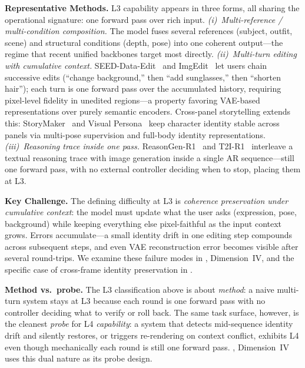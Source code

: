 \textbf{Representative Methods.} L3 capability appears in three forms, all sharing the operational signature: one forward pass over rich input. \textit{(i)~Multi-reference / multi-condition composition.} The model fuses several references (subject, outfit, scene) and structural conditions (depth, pose) into one coherent output---the regime that recent unified backbones target most directly. \textit{(ii)~Multi-turn editing with cumulative context.} SEED-Data-Edit~\citep{ge2024seed} and ImgEdit~\citep{ye2025imgedit} let users chain successive edits (``change background,'' then ``add sunglasses,'' then ``shorten hair''); each turn is one forward pass over the accumulated history, requiring pixel-level fidelity in unedited regions---a property favoring VAE-based representations over purely semantic encoders. Cross-panel storytelling extends this: StoryMaker~\citep{zhou2024storymaker} and Visual Persona~\citep{nam2025visual} keep character identity stable across panels via multi-pose supervision and full-body identity representations. \textit{(iii)~Reasoning trace inside one pass.} ReasonGen-R1~\citep{zhang2025reasongen} and T2I-R1~\citep{jiang2025t2i} interleave a textual reasoning trace with image generation inside a single AR sequence---still one forward pass, with no external controller deciding when to stop, placing them at L3.

\textbf{Key Challenge.} The defining difficulty at L3 is \emph{coherence preservation under cumulative context}: the model must update what the user asks (expression, pose, background) while keeping everything else pixel-faithful as the input context grows. Errors accumulate---a small identity drift in one editing step compounds across subsequent steps, and even VAE reconstruction error becomes visible after several round-trips. We examine these failure modes in , Dimension~IV, and the specific case of cross-frame identity preservation in .

\textbf{Method vs.\ probe.} The L3 classification above is about \emph{method}: a naive multi-turn system stays at L3 because each round is one forward pass with no controller deciding what to verify or roll back. The same task surface, however, is the cleanest \emph{probe} for L4 \emph{capability}: a system that detects mid-sequence identity drift and silently restores, or triggers re-rendering on context conflict, exhibits L4 even though mechanically each round is still one forward pass. , Dimension~IV uses this dual nature as its probe design.

